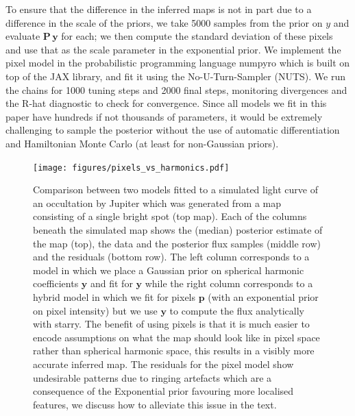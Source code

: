 \documentclass[12pt,dvipsnames]{report}
\begin{document}
To ensure that the difference in the inferred maps is not in part due to a difference in the scale of the priors, we take 5000 samples from the prior on $y$ and evaluate $\mathbf{P}\,\mathbf{y}$ for each; we then compute the standard deviation of these pixels and use that as the scale parameter in the exponential prior.
We implement the pixel model in the probabilistic programming language \textsf{numpyro} 
\citep{arXiv:1912.11554} which is built on top of the \textsf{JAX} 
library, and fit it using the No-U-Turn-Sampler (NUTS).
We run the chains for 1000 tuning steps and 2000 final steps, monitoring divergences 
\citep{2013arXiv1312.0906B} and the R-hat  diagnostic  \citep{1992StaSc...7..457G} to 
check for convergence.
Since all models we fit in this paper have hundreds if not thousands of parameters, it 
would be extremely challenging to sample the posterior  without the use of automatic 
differentiation and Hamiltonian Monte Carlo (at least for non-Gaussian priors).

\begin{figure}[t!]
    \begin{centering}
    \texttt{[image: figures/pixels\_vs\_harmonics.pdf]}
    \caption{
        Comparison between two models fitted to a simulated light curve of an occultation by Jupiter which was generated from a map consisting of a single bright spot (top map).  
       Each of the columns beneath the simulated map shows the (median) posterior estimate of the map (top), the data and the posterior flux samples (middle row) and the residuals (bottom row).
        The left column corresponds to a model in which we place a Gaussian prior on spherical harmonic coefficients $\mathbf{y}$ and fit for $\mathbf{y}$ while the right column corresponds to a hybrid model in which we fit for pixels $\mathbf{p}$ (with an exponential prior on pixel intensity) but we use $\mathbf{y}$ to compute the flux analytically with \textsf{starry}.
        The benefit of using pixels is that it is much easier to encode assumptions on what the map should look like in pixel space rather than spherical harmonic space, this results in a visibly more accurate inferred map.
        The residuals for the pixel model show undesirable patterns due to ringing artefacts which are a consequence of the Exponential prior favouring more localised features, we discuss how to alleviate this issue in the text.
    }
    \label{fig:pixels_vs_harmonics}
    \end{centering}
\end{figure}
\end{document}
